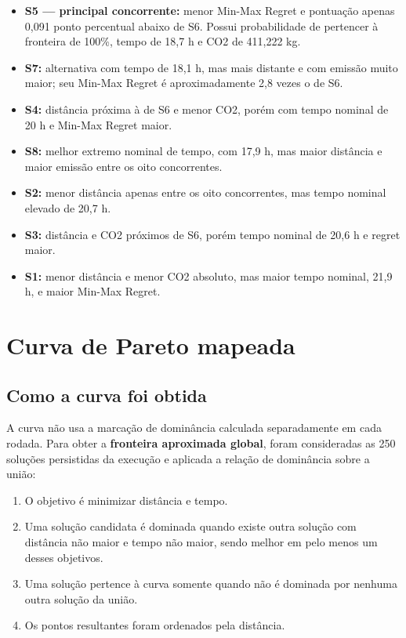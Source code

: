 \documentclass[12pt,a4paper]{article}
\begin{document}
\begin{itemize}[leftmargin=*]
  \item \textbf{S5 --- principal concorrente:} menor Min-Max Regret e pontuação apenas
  0,091 ponto percentual abaixo de S6. Possui probabilidade de pertencer à fronteira de
  100\%, tempo de 18,7 h e CO2 de 411,222 kg.
  \item \textbf{S7:} alternativa com tempo de 18,1 h, mas mais distante e com emissão
  muito maior; seu Min-Max Regret é aproximadamente 2,8 vezes o de S6.
  \item \textbf{S4:} distância próxima à de S6 e menor CO2, porém com tempo nominal de
  20 h e Min-Max Regret maior.
  \item \textbf{S8:} melhor extremo nominal de tempo, com 17,9 h, mas maior distância e
  maior emissão entre os oito concorrentes.
  \item \textbf{S2:} menor distância apenas entre os oito concorrentes, mas tempo nominal
  elevado de 20,7 h.
  \item \textbf{S3:} distância e CO2 próximos de S6, porém tempo nominal de 20,6 h e
  regret maior.
  \item \textbf{S1:} menor distância e menor CO2 absoluto, mas maior tempo nominal,
  21,9 h, e maior Min-Max Regret.
\end{itemize}

\section{Curva de Pareto mapeada}

\subsection{Como a curva foi obtida}

A curva não usa a marcação de dominância calculada separadamente em cada rodada.
Para obter a \textbf{fronteira aproximada global}, foram consideradas as 250 soluções
persistidas da execução e aplicada a relação de dominância sobre a união:

\begin{enumerate}[leftmargin=*]
  \item O objetivo é minimizar distância e tempo.
  \item Uma solução candidata é dominada quando existe outra solução com distância não
  maior e tempo não maior, sendo melhor em pelo menos um desses objetivos.
  \item Uma solução pertence à curva somente quando não é dominada por nenhuma outra
  solução da união.
  \item Os pontos resultantes foram ordenados pela distância.
\end{enumerate}
\end{document}
